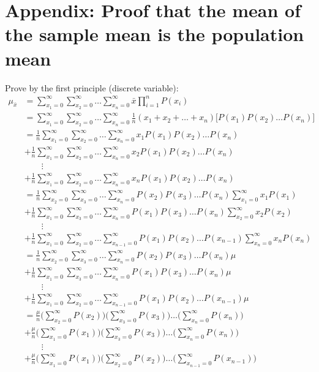 \documentclass[12pt,a4paper]{report}
\begin{document}
\section{Appendix: Proof that the mean of the sample mean is the population mean} \label{proof}
Prove by the first principle (discrete variable):
\begin{align*}
\mu_{\bar{x}}
&= \sum_{x_1 = 0}^{\infty} \sum_{x_2 = 0}^{\infty} \dots \sum_{x_n = 0}^{\infty} \bar{x} \prod_{i = 1}^{n} P(x_i) \\
&= \sum_{x_1 = 0}^{\infty} \sum_{x_2 = 0}^{\infty} \dots \sum_{x_n = 0}^{\infty} \frac{1}{n} ( x_1 + x_2 + \dots + x_n) \Big[ P(x_1) P(x_2) \dots P(x_n) \Big] \\
&= \frac{1}{n} \sum_{x_1 = 0}^{\infty} \sum_{x_2 = 0}^{\infty} \dots \sum_{x_n = 0}^{\infty} x_1 P(x_1) P(x_2) \dots P(x_n) \\
&+ \frac{1}{n} \sum_{x_1 = 0}^{\infty} \sum_{x_2 = 0}^{\infty} \dots \sum_{x_n = 0}^{\infty} x_2 P(x_1) P(x_2) \dots P(x_n) \\
& \qquad \vdots \\
&+ \frac{1}{n} \sum_{x_1 = 0}^{\infty} \sum_{x_2 = 0}^{\infty} \dots \sum_{x_n = 0}^{\infty} x_n P(x_1) P(x_2) \dots P(x_n) \\
&= \frac{1}{n} \sum_{x_2 = 0}^{\infty} \sum_{x_3 = 0}^{\infty} \dots \sum_{x_n = 0}^{\infty} P(x_2) P(x_3) \dots P(x_n) \sum_{x_1 = 0}^{\infty} x_1 P(x_1) \\
&+ \frac{1}{n} \sum_{x_1 = 0}^{\infty} \sum_{x_3 = 0}^{\infty} \dots \sum_{x_n = 0}^{\infty} P(x_1) P(x_3) \dots P(x_n) \sum_{x_2 = 0}^{\infty} x_2 P(x_2) \\
& \qquad \vdots \\
&+ \frac{1}{n} \sum_{x_1 = 0}^{\infty} \sum_{x_2 = 0}^{\infty} \dots \sum_{x_{n-1} = 0}^{\infty} P(x_1) P(x_2) \dots P(x_{n-1}) \sum_{x_n = 0}^{\infty} x_n P(x_n) \\
&= \frac{1}{n} \sum_{x_2 = 0}^{\infty} \sum_{x_3 = 0}^{\infty} \dots \sum_{x_n = 0}^{\infty} P(x_2) P(x_3) \dots P(x_n) \mu \\
&+ \frac{1}{n} \sum_{x_1 = 0}^{\infty} \sum_{x_3 = 0}^{\infty} \dots \sum_{x_n = 0}^{\infty} P(x_1) P(x_3) \dots P(x_n) \mu \\
& \qquad \vdots \\
&+ \frac{1}{n} \sum_{x_1 = 0}^{\infty} \sum_{x_2 = 0}^{\infty} \dots \sum_{x_{n-1} = 0}^{\infty} P(x_1) P(x_2) \dots P(x_{n-1}) \mu \\
&= \frac{\mu}{n} \Bigg( \sum_{x_2 = 0}^{\infty} P(x_2) \Bigg) \Bigg( \sum_{x_3 = 0}^{\infty} P(x_3) \Bigg) \dots \Bigg( \sum_{x_n = 0}^{\infty} P(x_n) \Bigg) \\
&+ \frac{\mu}{n} \Bigg( \sum_{x_1 = 0}^{\infty} P(x_1) \Bigg) \Bigg( \sum_{x_3 = 0}^{\infty} P(x_3) \Bigg) \dots \Bigg( \sum_{x_n = 0}^{\infty} P(x_n) \Bigg) \\
& \qquad \vdots \\
&+ \frac{\mu}{n} \Bigg( \sum_{x_1 = 0}^{\infty} P(x_1) \Bigg) \Bigg( \sum_{x_2 = 0}^{\infty} P(x_2) \Bigg) \dots \Bigg( \sum_{x_{n-1} = 0}^{\infty} P(x_{n-1}) \Bigg)
\end{align*}
\end{document}
